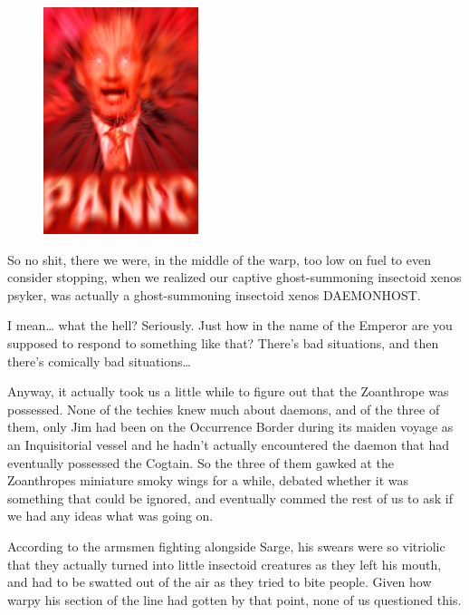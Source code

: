 

\begin{figure}
	\begin{center}
		\includegraphics[width=\figwidth]{pics/15/38.png}
	\end{center}
\end{figure}
So no shit, there we were, in the middle of the warp, too low on fuel to even consider stopping, when we realized our captive ghost-summoning insectoid xenos psyker, was actually a ghost-summoning insectoid xenos DAEMONHOST. 


I mean… what the hell? 
Seriously. 
Just how in the name of the Emperor are you supposed to respond to something like that? 
There's bad situations, and then there's comically bad situations…

Anyway, it actually took us a little while to figure out that the Zoanthrope was possessed. 
None of the techies knew much about daemons, and of the three of them, only Jim had been on the Occurrence Border during its maiden voyage as an Inquisitorial vessel and he hadn't actually encountered the daemon that had eventually possessed the Cogtain. 
So the three of them gawked at the Zoanthropes miniature smoky wings for a while, debated whether it was something that could be ignored, and eventually commed the rest of us to ask if we had any ideas what was going on.

According to the armsmen fighting alongside Sarge, his swears were so vitriolic that they actually turned into little insectoid creatures as they left his mouth, and had to be swatted out of the air as they tried to bite people. 
Given how warpy his section of the line had gotten by that point, none of us questioned this. 


